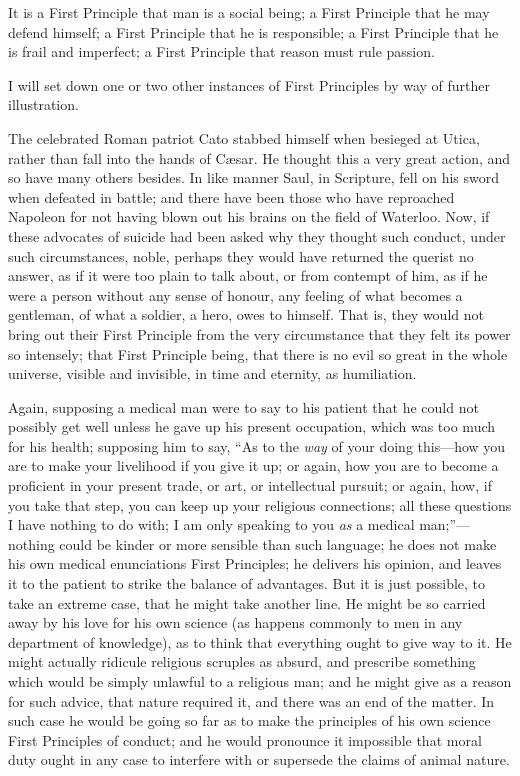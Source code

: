 It is a First Principle that man is a social being; a
First Principle that he may defend himself; a First
Principle that he is responsible; a First Principle that
he is frail and imperfect; a First Principle that reason
must rule passion.

I will set down one or two other instances of First
Principles by way of further illustration.

The celebrated Roman patriot Cato stabbed himself when
besieged at Utica, rather than fall into the hands of Cæsar. He thought this a very great action, and so have
many others besides. In like manner Saul, in Scripture,
fell on his sword when defeated in battle; and there have
been those who have reproached Napoleon for not having
blown out his brains on the field of Waterloo. Now, if
these advocates of suicide had been asked why they
thought such conduct, under such circumstances, noble,
perhaps they would have returned the querist no answer,
as if it were too plain to talk about, or from contempt
of him, as if he were a person without any sense of
honour, any feeling of what becomes a gentleman, of what
a soldier, a hero, owes to himself. That is, they would
not bring out their First Principle from the very
circumstance that they felt its power so intensely; that
First Principle being, that there is no evil so great in
the whole universe, visible and invisible, in time and
eternity, as humiliation.

Again, supposing a medical man were to say to his
patient that he could not possibly get well unless he
gave up his present occupation, which was too much for
his health; supposing him to say, ``As to the \emph{way}
of your doing this—how you are to make your
livelihood if you give it up; or again, how you are to
become a proficient in your present trade, or art, or intellectual pursuit; or again, how, if you take that
step, you can keep up your religious connections; all
these questions I have nothing to do with; I am only
speaking to you \emph{as} a medical
man;''—nothing could be kinder or more sensible
than such language; he does not make his own medical
enunciations First Principles; he delivers his opinion,
and leaves it to the patient to strike the balance of
advantages. But it is just possible, to take an extreme
case, that he might take another line. He might be so
carried away by his love for his own science (as happens
commonly to men in any department of knowledge), as to
think that everything ought to give way to it. He might
actually ridicule religious scruples as absurd, and
prescribe something which would be simply unlawful to a
religious man; and he might give as a reason for such
advice, that nature required it, and there was an end of
the matter. In such case he would be going so far as to
make the principles of his own science First Principles
of conduct; and he would pronounce it impossible that
moral duty ought in any case to interfere with or
supersede the claims of animal nature.

